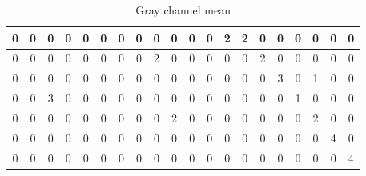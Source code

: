 \documentclass{IEEEtran}
\begin{document}
\begin{table}[h!]
\begin{tabular}{|c|c|c|c|c|c|c|c|c|c|c|c|c|c|c|c|c|c|c|c|}
\hline
0 & 0 & 0 & 0 & 0 & 0 & 0 & 0 & 0 & 0 & 0 & 0 & 2 & \cellcolor{green!40}2 & 0 & 0 & 0 & 0 & 0 & 0\\
\hline
0 & 0 & 0 & 0 & 0 & 0 & 0 & 0 & \cellcolor{red!25}2 & 0 & 0 & 0 & 0 & 0 & \cellcolor{green!40}2 & 0 & 0 & 0 & 0 & 0\\
\hline
0 & 0 & 0 & 0 & 0 & 0 & 0 & 0 & 0 & 0 & 0 & 0 & 0 & 0 & 0 & \cellcolor{green!40}3 & 0 & \cellcolor{red!25}1 & 0 & 0\\
\hline
0 & 0 & \cellcolor{red!25}3 & 0 & 0 & 0 & 0 & 0 & 0 & 0 & 0 & 0 & 0 & 0 & 0 & 0 & \cellcolor{green!40}1 & 0 & 0 & 0\\
\hline
0 & 0 & 0 & 0 & 0 & 0 & 0 & 0 & 0 & \cellcolor{red!25}2 & 0 & 0 & 0 & 0 & 0 & 0 & 0 & \cellcolor{green!40}2 & 0 & 0\\
\hline
0 & 0 & 0 & 0 & 0 & 0 & 0 & 0 & 0 & 0 & 0 & 0 & 0 & 0 & 0 & 0 & 0 & 0 & \cellcolor{green!40}4 & 0\\
\hline
0 & 0 & 0 & 0 & 0 & 0 & 0 & 0 & 0 & 0 & 0 & 0 & 0 & 0 & 0 & 0 & 0 & 0 & 0 & \cellcolor{green!40}4\\
\hline
\end{tabular}
\caption{Gray channel mean}
\label{tb:gray_mean}
\end{table}

\end{document}
